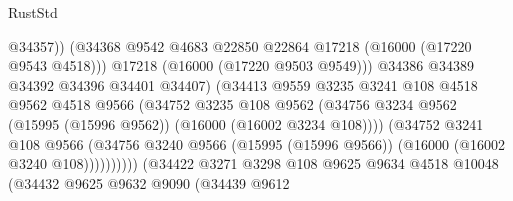 \begin{lexlean}{RustStd}
\begin{coremodule}
                                            @34357))
                                        (@34368
                                          @9542
                                          @4683
                                          @22850
                                          @22864
                                          @17218
                                          (@16000 (@17220 @9543 @4518)))
                                        @17218
                                        (@16000 (@17220 @9503 @9549)))
                                      @34386
                                      @34389
                                      @34392
                                      @34396
                                      @34401
                                      @34407)
                                    (@34413
                                      @9559
                                      @3235
                                      @3241
                                      @108
                                      @4518
                                      @9562
                                      @4518
                                      @9566
                                      (@34752
                                        @3235
                                        @108
                                        @9562
                                        (@34756
                                          @3234
                                          @9562
                                          (@15995 (@15996 @9562))
                                          (@16000 (@16002 @3234 @108))))
                                      (@34752
                                        @3241
                                        @108
                                        @9566
                                        (@34756
                                          @3240
                                          @9566
                                          (@15995 (@15996 @9566))
                                          (@16000 (@16002 @3240 @108))))))))))
                          (@34422
                            @3271
                            @3298
                            @108
                            @9625
                            @9634
                            @4518
                            @10048
                            (@34432
                              @9625
                              @9632
                              @9090
                              (@34439
                                @9612

\end{coremodule}
\end{lexlean}
